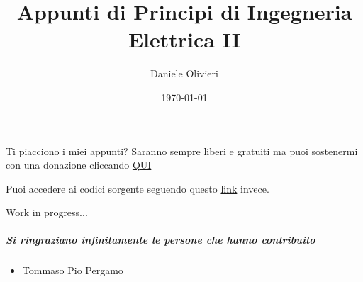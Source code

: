 \documentclass[a4paper,11pt]{scrartcl}
\title{Appunti di Principi di Ingegneria Elettrica II}
\author{Daniele Olivieri}
\date{\today}
\begin{document}
\maketitle
Ti piacciono i miei appunti? Saranno sempre liberi e gratuiti ma puoi sostenermi con una donazione cliccando \href{https://www.paypal.com/donate?hosted_button_id=7KELP768NJSYW}{QUI}

Puoi accedere ai codici sorgente seguendo questo \href{https://github.com/FlashNoob98/appunti_principi_II_unina}{link} invece.
\setcounter{tocdepth}{2}
\tableofcontents
\setlength\arrayrulewidth{1.2pt} %





























Work in progress...
\subparagraph{Si ringraziano infinitamente le persone che hanno contribuito}
\begin{itemize}
\item Tommaso Pio Pergamo
\end{itemize}
\end{document}
